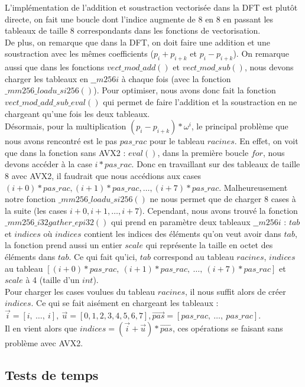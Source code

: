 \documentclass[12pt, a4paper]{article}
\begin{document}
L'implémentation de l'addition et soustraction vectorisée dans la DFT est plutôt directe, on fait une boucle dont l'indice augmente de 8 en 8 en passant les tableaux de taille 8 correspondants dans les fonctions de vectorisation. \\
De plus, on remarque que dans la DFT, on doit faire une addition et une soustraction avec les mêmes coefficients ($p_i+p_{i+k}$ et $p_i-p_{i+k}$). On remarque aussi que dans les fonctions $vect\_mod\_add()$ et $vect\_mod\_sub()$, nous devons charger les tableaux en $\_\_m256i$ à chaque fois (avec la fonction $\_mm256\_loadu\_si256()$). Pour optimiser, nous avons donc fait la fonction $vect\_mod\_add\_sub\_eval()$ qui permet de faire l'addition et la soustraction en ne chargeant qu'une fois les deux tableaux. \\
\indent Désormais, pour la multiplication $(p_i-p_{i+k})*\omega^i$, le principal problème que nous avons rencontré est le pas $pas\_rac$ pour le tableau $racines$. En effet, on voit que dans la fonction sans AVX2 : $eval()$, dans la première boucle $for$, nous devons accéder à la case $i*pas\_rac$. Donc en travaillant sur des tableaux de taille 8 avec AVX2, il faudrait que nous accédions aux cases $(i+0)*pas\_rac,(i+1)*pas\_rac,\dots,(i+7)*pas\_rac$. 
Malheureusement notre fonction $\_mm256\_loadu\_si256()$ ne nous permet que de charger 8 cases à la suite (les cases $i+0, i+1,\dots,i+7$).
Cependant, nous avons trouvé la fonction $\_mm256\_i32gather\_epi32()$ qui prend en paramètre deux tableaux $\_\_m256i$ : $tab$ et $indices$ où $indices$ contient les indices des éléments qu'on veut avoir dans $tab$, la fonction prend aussi un entier $scale$ qui représente la taille en octet des éléments dans $tab$. Ce qui fait qu'ici, $tab$ correspond au tableau $racines$, $indices$ au tableau $[(i+0)*pas\_rac,\ (i+1)*pas\_rac,\ \dots,\ (i+7)*pas\_rac]$ et $scale$ à 4 (taille d'un $int$).\\
\indent Pour charger les cases voulues du tableau $racines$, il nous suffit alors de créer $indices$. Ce qui se fait aisément en chargeant les tableaux : \\ $\overrightarrow{i} = [i,\ \dots,\ i],\  \overrightarrow{u} = [0, 1, 2, 3, 4, 5, 6, 7], \overrightarrow{pas} = [pas\_rac,\ \dots,\ pas\_rac]$. \\
Il en vient alors que $indices = (\overrightarrow{i}+\overrightarrow{u})*\overrightarrow{pas}$, ces opérations se faisant sans problème avec AVX2.

\subsection{Tests de temps}
\end{document}

